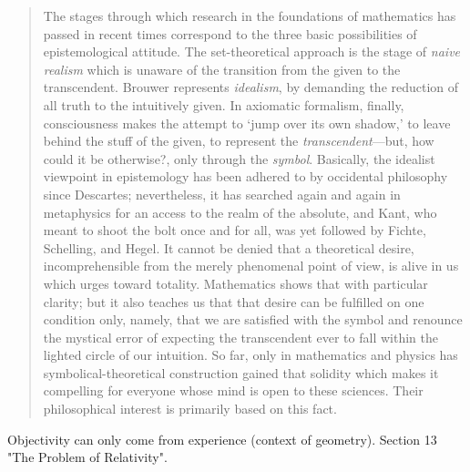\begin{quote}
    The stages through which research in the foundations of mathematics has passed in recent times correspond to the three basic possibilities of epistemological attitude.  The set-theoretical approach is the stage of \emph{naive realism} which is unaware of the transition from the given to the transcendent.  Brouwer represents \emph{idealism}, by demanding the reduction of all truth to the intuitively given.  In axiomatic formalism, finally, consciousness makes the attempt to `jump over its own shadow,' to leave behind the stuff of the given, to represent the \emph{transcendent}---but, how could it be otherwise?, only through the \emph{symbol}.  Basically, the idealist viewpoint in epistemology has been adhered to by occidental philosophy since Descartes; nevertheless, it has searched again and again in metaphysics for an access to the realm of the absolute, and Kant, who meant to shoot the bolt once and for all, was yet followed by Fichte, Schelling, and Hegel.  It cannot be denied that a theoretical desire, incomprehensible from the merely phenomenal point of view, is alive in us which urges toward totality.  Mathematics shows that with particular clarity; but it also teaches us that that desire can be fulfilled on one condition only, namely, that we are satisfied with the symbol and renounce the mystical error of expecting the transcendent ever to fall within the lighted circle of our intuition.  So far, only in mathematics and physics has symbolical-theoretical construction gained that solidity which makes it compelling for everyone whose mind is open to these sciences.  Their philosophical interest is primarily based on this fact.  \citep[p. 65-66]{Weyl1949}
\end{quote}


Objectivity can only come from experience (context of geometry).  Section 13 "The Problem of Relativity".

